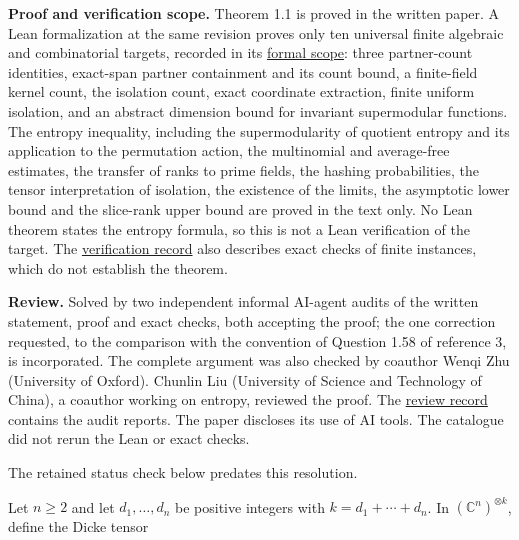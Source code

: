\documentclass[11pt,a4paper]{article}
\makeatletter
\renewcommand{\subsection}{\Needspace{4\baselineskip}\@startsection{subsection}{2}{0pt}{9pt plus 1pt minus 1pt}{3pt}{\sffamily\bfseries\normalsize\color{ink}}}
\makeatother
\begin{document}
\textbf{Proof and verification scope.} Theorem 1.1 is proved in the
written paper. A Lean formalization at the same revision proves only ten
universal finite algebraic and combinatorial targets, recorded in its
\href{https://github.com/erenup/dicke-tensor-subrank/blob/e344c05618a8a76941fc6dc166b22ed54384f6cf/lean/SCOPE.md}{formal
scope}: three partner-count identities, exact-span partner containment
and its count bound, a finite-field kernel count, the isolation count,
exact coordinate extraction, finite uniform isolation, and an abstract
dimension bound for invariant supermodular functions. The entropy
inequality, including the supermodularity of quotient entropy and its
application to the permutation action, the multinomial and average-free
estimates, the transfer of ranks to prime fields, the hashing
probabilities, the tensor interpretation of isolation, the existence of
the limits, the asymptotic lower bound and the slice-rank upper bound
are proved in the text only. No Lean theorem states the entropy formula,
so this is not a Lean verification of the target. The
\href{https://github.com/erenup/dicke-tensor-subrank/blob/e344c05618a8a76941fc6dc166b22ed54384f6cf/VERIFICATION.md}{verification
record} also describes exact checks of finite instances, which do not
establish the theorem.

\textbf{Review.} Solved by two independent informal AI-agent audits of
the written statement, proof and exact checks, both accepting the proof;
the one correction requested, to the comparison with the convention of
Question 1.58 of reference 3, is incorporated. The complete argument was
also checked by coauthor Wenqi Zhu (University of Oxford). Chunlin Liu
(University of Science and Technology of China), a coauthor working on
entropy, reviewed the proof. The
\href{https://github.com/erenup/dicke-tensor-subrank/blob/e344c05618a8a76941fc6dc166b22ed54384f6cf/verification/reviews/README.md}{review
record} contains the audit reports. The paper discloses its use of AI
tools. The catalogue did not rerun the Lean or exact checks.

The retained status check below predates this resolution.

\subsection{Problem statement}\label{problem-statement}

Let \(n\geq2\) and let \(d_1,\ldots,d_n\) be positive integers with
\(k=d_1+\cdots+d_n\). In \((\mathbb C^n)^{\otimes k}\), define the Dicke
tensor
\end{document}
